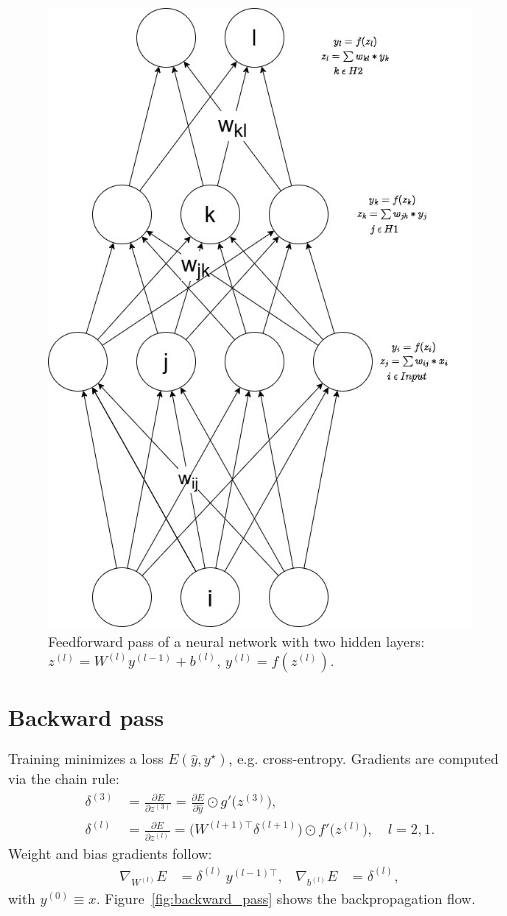 \begin{figure}[ht]
    \centering 
    \includegraphics[width=0.6\linewidth]{figures/neural_net.jpg}
    \caption{Feedforward pass of a neural network with two hidden layers: \(z^{(l)}=W^{(l)}y^{(l-1)}+b^{(l)}\), \(y^{(l)}=f(z^{(l)})\).}
    \label{fig:forward_pass}
\end{figure}

\subsection{Backward pass}
Training minimizes a loss \(E(\hat y, y^\star)\), e.g. cross-entropy. Gradients are computed via the chain rule:
\begin{align}
\delta^{(3)} &= \frac{\partial E}{\partial z^{(3)}}
= \frac{\partial E}{\partial \hat y}\odot g'\bigl(z^{(3)}\bigr),\\
\delta^{(l)} &= \frac{\partial E}{\partial z^{(l)}}
= \bigl(W^{(l+1)\top}\delta^{(l+1)}\bigr)\odot f'\bigl(z^{(l)}\bigr),
\quad l=2,1.
\end{align}
Weight and bias gradients follow:
\begin{align}
\nabla_{W^{(l)}}E &= \delta^{(l)}\,y^{(l-1)\top}, &
\nabla_{b^{(l)}}E &= \delta^{(l)},
\end{align}
with \(y^{(0)}\equiv x\). Figure~\ref{fig:backward_pass} shows the backpropagation flow.

